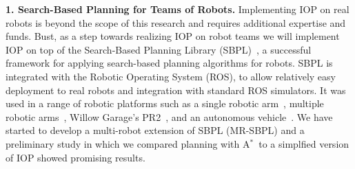 \documentclass[11pt]{article}
\newcommand{\astar}{A$^*$}
\begin{document}
{\bf 1. Search-Based Planning for Teams of Robots.}
Implementing IOP on real robots is beyond the scope of this research and requires additional expertise and funds. Bust, as a step towards realizing IOP on robot teams we will implement IOP on top of the Search-Based Planning Library (SBPL)~\cite{likhachev2010sbpl}, a successful framework for applying search-based planning algorithms for robots. SBPL is integrated with the Robotic Operating System (ROS), to allow relatively easy deployment to real robots and integration with standard ROS simulators. It was used in a range of robotic platforms such as a single robotic arm~\cite{stern2014potential,aine2015learning}, multiple robotic arms~\cite{cohen2014planning}, Willow Garage’s PR2~\cite{phillips2012graphs}, and an autonomous vehicle~\cite{likhachev2009planning}. We have started to develop a multi-robot extension of SBPL (MR-SBPL) and a preliminary study in which we compared planning with \astar\ to a simplfied version of IOP showed promising results. 

\end{document}
